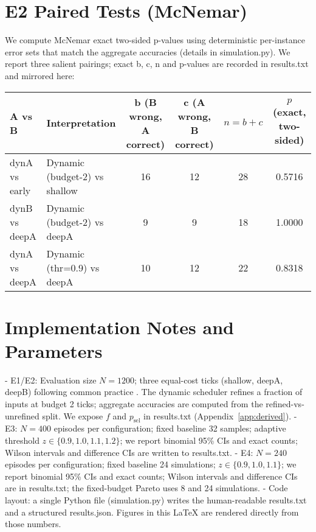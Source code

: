 \section{E2 Paired Tests (McNemar)}
We compute McNemar exact two-sided p-values using deterministic per-instance error sets that match the aggregate accuracies (details in simulation.py). We report three salient pairings; exact b, c, n and p-values are recorded in results.txt and mirrored here:
\begin{center}
\begin{adjustbox}{width=\linewidth}
\begin{tabular}{l l c c c c}
\toprule
A vs B & Interpretation & b (B wrong, A correct) & c (A wrong, B correct) & $n=b+c$ & $p$ (exact, two-sided) \\
\midrule
dynA vs early & Dynamic (budget-2) vs shallow & 16 & 12 & 28 & 0.5716 \\
dynB vs deepA & Dynamic (budget-2) vs deepA    & 9  & 9  & 18 & 1.0000 \\
dynA vs deepA & Dynamic (thr=0.9) vs deepA     & 10 & 12 & 22 & 0.8318 \\
\bottomrule
\end{tabular}
\end{adjustbox}
\end{center}

\section{Implementation Notes and Parameters}
\label{app:impl}
- E1/E2: Evaluation size $N=1200$; three equal-cost ticks (shallow, deepA, deepB) following common practice \cite{Huang2018MSDNet,Wang2018SkipNet}. The dynamic scheduler refines a fraction of inputs at budget 2 ticks; aggregate accuracies are computed from the refined-vs-unrefined split. We expose $f$ and $p_{\mathrm{sel}}$ in results.txt (Appendix~\ref{app:derived}).
- E3: $N=400$ episodes per configuration; fixed baseline 32 samples; adaptive threshold $z \in \{0.9,1.0,1.1,1.2\}$; we report binomial 95\% CIs and exact counts; Wilson intervals and difference CIs are written to results.txt.
- E4: $N=240$ episodes per configuration; fixed baseline 24 simulations; $z \in \{0.9,1.0,1.1\}$; we report binomial 95\% CIs and exact counts; Wilson intervals and difference CIs are in results.txt; the fixed-budget Pareto uses 8 and 24 simulations.
- Code layout: a single Python file (simulation.py) writes the human-readable results.txt and a structured results.json. Figures in this LaTeX are rendered directly from those numbers.

